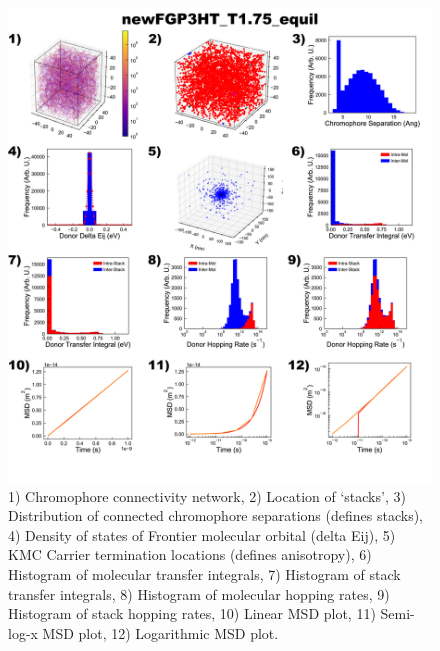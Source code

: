 \documentclass[12pt]{article}
\begin{document}
\begin{figure}[h]\centering
	\includegraphics[width=\textwidth]{Figures/newFGP3HT_T1.75_equil.png}
    \caption{   1) Chromophore connectivity network, 
                2) Location of `stacks', 
                3) Distribution of connected chromophore separations (defines stacks),
                4) Density of states of Frontier molecular orbital (delta Eij),
                5) KMC Carrier termination locations (defines anisotropy),
                6) Histogram of molecular transfer integrals,
                7) Histogram of stack transfer integrals,
                8) Histogram of molecular hopping rates,
                9) Histogram of stack hopping rates,
                10) Linear MSD plot,
                11) Semi-log-x MSD plot,
                12) Logarithmic MSD plot.}
	\label{fig:EqlT1.75}
\end{figure}
\end{document}
